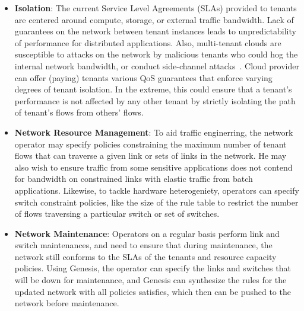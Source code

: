 \begin{itemize}
\item \textbf{Isolation}: The current Service Level Agreements (SLAs)
  provided to tenants are centered around compute, storage, or
  external traffic bandwidth. Lack of guarantees on the network
  between tenant instances leads to unpredictability of performance
  for distributed applications. Also, multi-tenant clouds are
  susceptible to attacks on the network by malicious tenants who could
  hog the internal network bandwidth, or conduct side-channel
  attacks~\cite{heyyou-ccs}. %
  Cloud provider can offer (paying) tenants various QoS guarantees
  that enforce varying degrees of tenant isolation. In the extreme,
  this could ensure that a tenant's performance is not affected by
  any other tenant by strictly isolating the path of tenant's flows
  from others' flows. 
\item \textbf{Network Resource Management}: To aid traffic
  enginerring, the network operator may specify policies constraining
  the maximum number of tenant flows that can traverse a given link or
  sets of links in the network. He may also wish to ensure traffic
  from some sensitive applications does not contend for bandwidth on
  constrained links with elastic traffic from batch applications.
  Likewise, to tackle hardware heterogeniety, operators can specify
  switch constraint policies, like the size of the rule table to
  restrict the number of flows traversing a particular switch or set
  of switches.
\item \textbf{Network Maintenance}:  Operators on a regular basis perform link and
  switch maintenances, and need to ensure that during maintenance, the network still
  conforms to the SLAs of the tenants and resource capacity
  policies.    Using Genesis, the operator
  can specify the links and switches that will be down for maintenance, and Genesis can synthesize 
  the rules for the updated network with all policies satisfies, which then can be pushed to 
  the network before maintenance. 
\end{itemize}

